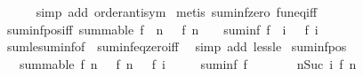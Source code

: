 \begin{isabellebody}
\ \ \ \ \isamarkupfalse%
\ {\isacharparenleft}{\kern0pt}simp\ add{\isacharcolon}{\kern0pt}\ order{\isachardot}{\kern0pt}antisym{\isacharparenright}{\kern0pt}\isanewline
{}\isamarkupfalse%
\ {\isacharparenleft}{\kern0pt}metis\ suminf{\isacharunderscore}{\kern0pt}zero\ fun{\isacharunderscore}{\kern0pt}eq{\isacharunderscore}{\kern0pt}iff{\isacharparenright}{\kern0pt}%
\endisatagproof
{\isafoldproof}%
%
\isadelimproof
\isanewline
%
\endisadelimproof
\isanewline
{}\isamarkupfalse%
\ suminf{\isacharunderscore}{\kern0pt}pos{\isacharunderscore}{\kern0pt}iff{\isacharcolon}{\kern0pt}\ {\isachardoublequoteopen}summable\ f\ {\isasymLongrightarrow}\ {\isacharparenleft}{\kern0pt}{\isasymAnd}n{\isachardot}{\kern0pt}\ {}\ {\isasymle}\ f\ n{\isacharparenright}{\kern0pt}\ {\isasymLongrightarrow}\ {}\ {\isacharless}{\kern0pt}\ suminf\ f\ {\isasymlongleftrightarrow}\ {\isacharparenleft}{\kern0pt}{\isasymexists}i{\isachardot}{\kern0pt}\ {}\ {\isacharless}{\kern0pt}\ f\ i{\isacharparenright}{\kern0pt}{\isachardoublequoteclose}\isanewline
%
\isadelimproof
\ \ %
\endisadelimproof
%
\isatagproof
{}\isamarkupfalse%
\ sum{\isacharunderscore}{\kern0pt}le{\isacharunderscore}{\kern0pt}suminf{\isacharbrackleft}{\kern0pt}of\ {\isachardoublequoteopen}{\isacharbraceleft}{\kern0pt}{\isacharbraceright}{\kern0pt}{\isachardoublequoteclose}{\isacharbrackright}{\kern0pt}\ suminf{\isacharunderscore}{\kern0pt}eq{\isacharunderscore}{\kern0pt}zero{\isacharunderscore}{\kern0pt}iff\ \isamarkupfalse%
\ {\isacharparenleft}{\kern0pt}simp\ add{\isacharcolon}{\kern0pt}\ less{\isacharunderscore}{\kern0pt}le{\isacharparenright}{\kern0pt}%
\endisatagproof
{\isafoldproof}%
%
\isadelimproof
\isanewline
%
\endisadelimproof
\isanewline
{}\isamarkupfalse%
\ suminf{\isacharunderscore}{\kern0pt}pos{}{\isacharcolon}{\kern0pt}\isanewline
\ \ \ {\isachardoublequoteopen}summable\ f{\isachardoublequoteclose}\ {\isachardoublequoteopen}{\isasymAnd}n{\isachardot}{\kern0pt}\ {}\ {\isasymle}\ f\ n{\isachardoublequoteclose}\ {\isachardoublequoteopen}{}\ {\isacharless}{\kern0pt}\ f\ i{\isachardoublequoteclose}\isanewline
\ \ \ {\isachardoublequoteopen}{}\ {\isacharless}{\kern0pt}\ suminf\ f{\isachardoublequoteclose}\isanewline
%
\isadelimproof
%
\endisadelimproof
%
\isatagproof
{}\isamarkupfalse%
\ {\isacharminus}{\kern0pt}\isanewline
\ \ \isamarkupfalse%
\ {\isachardoublequoteopen}{}\ {\isacharless}{\kern0pt}\ {\isacharparenleft}{\kern0pt}{\isasymSum}n{\isacharless}{\kern0pt}Suc\ i{\isachardot}{\kern0pt}\ f\ n{\isacharparenright}{\kern0pt}{\isachardoublequoteclose}\isanewline

\end{isabellebody}
